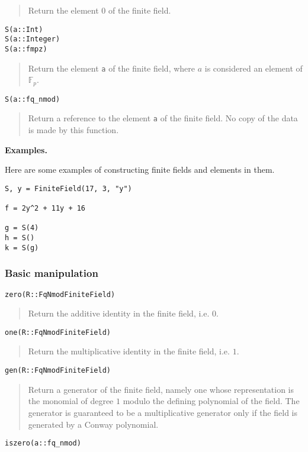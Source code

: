 \documentclass[a4paper,10pt]{article}
\newcommand{\F}{\mathbb{F}}
\newcommand{\code}{\lstinline}
\newcommand{\desc}[1]{\vspace{-3mm}\begin{quote}#1\end{quote}}
\begin{document}
{{\desc{Return the element $0$ of the finite field.}

\begin{lstlisting}
S(a::Int)
S(a::Integer)
S(a::fmpz)
\end{lstlisting}

\desc{Return the element \code{a} of the finite field, where $a$ is considered 
an element of $\F_p$.}

\begin{lstlisting}
S(a::fq_nmod)
\end{lstlisting}

\desc{Return a reference to the element \code{a} of the finite field. No copy
of the data is made by this function.}

\textbf{Examples.}

Here are some examples of constructing finite fields and elements in them.

\begin{lstlisting}
S, y = FiniteField(17, 3, "y")

f = 2y^2 + 11y + 16

g = S(4)
h = S()
k = S(g)
\end{lstlisting}

\subsubsection{Basic manipulation}

\begin{lstlisting}
zero(R::FqNmodFiniteField)
\end{lstlisting}

\desc{Return the additive identity in the finite field, i.e. $0$.}

\begin{lstlisting}
one(R::FqNmodFiniteField)
\end{lstlisting}

\desc{Return the multiplicative identity in the finite field, i.e. $1$.}

\begin{lstlisting}
gen(R::FqNmodFiniteField)
\end{lstlisting}

\desc{Return a generator of the finite field, namely one whose
representation is the monomial of degree $1$ modulo the defining
polynomial of the field. The generator is guaranteed to be a multiplicative 
generator only if the field is generated by a Conway polynomial.}

\begin{lstlisting}
iszero(a::fq_nmod)
\end{lstlisting}

}}
\end{document}
